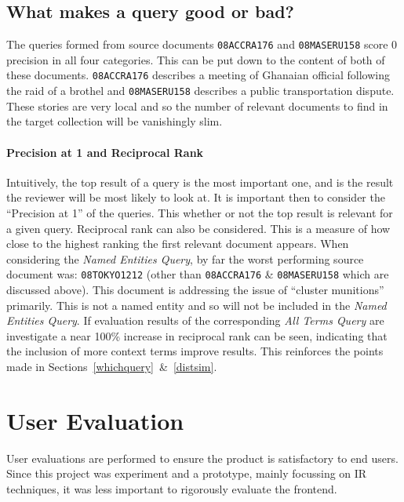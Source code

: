 \documentclass{l4proj}
\newcommand{\code}[1]{\texttt{#1}}
\begin{document}
\subsection{What makes a query good or bad?}
The queries formed from source documents \code{08ACCRA176} and \code{08MASERU158} score 0 precision in all four categories. This can be put down to the content of both of these documents. \code{08ACCRA176} describes a meeting of Ghanaian official following the raid of a brothel and \code{08MASERU158} describes a public transportation dispute. These stories are very local and so the number of relevant documents to find in the target collection will be vanishingly slim. \\
\paragraph{Precision at 1 and Reciprocal Rank}
Intuitively, the top result of a query is the most important one, and is the result the reviewer will be most likely to look at. It is important then to consider the ``Precision at 1'' of the queries. This whether or not the top result is relevant for a given query.
Reciprocal rank can also be considered. This is a measure of how close to the highest ranking the first relevant document appears. When considering the \textit{Named Entities Query}, by far the worst performing source document was: \code{08TOKYO1212} (other than \code{08ACCRA176} \& \code{08MASERU158} which are discussed above). This document is addressing the issue of ``cluster munitions'' primarily. This is not a named entity and so will not be included in the \textit{Named Entities Query}. If evaluation results of the corresponding \textit{All Terms Query} are investigate a near 100\% increase in reciprocal rank can be seen, indicating that the inclusion of more context terms improve results. This reinforces the points made in Sections~\ref{whichquery}~\&~\ref{distsim}.

\section{User Evaluation} \label{userevaluation}
User evaluations are performed to ensure the product is satisfactory to end users. Since this project was experiment and a prototype, mainly focussing on IR techniques, it was less important to rigorously evaluate the frontend.
\end{document}
